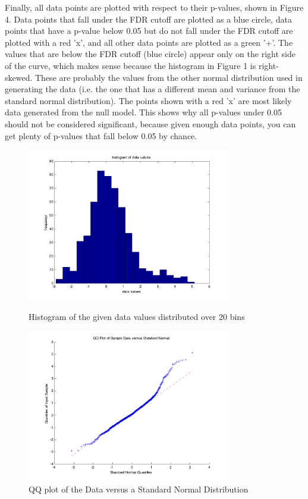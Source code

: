 \documentclass{acm_proc_article-sp}
\begin{document}
Finally, all data points are plotted with respect to their p-values, shown in Figure 4.  Data points that fall under the FDR cutoff are plotted as a blue circle, data points that have a p-value below 0.05 but do not fall under the FDR cutoff are plotted with a red 'x', and all other data points are plotted as a green '+'.  The values that are below the FDR cutoff (blue circle) appear only on the right side of the curve, which makes sense because the histogram in Figure 1 is right-skewed.  These are probably the values from the other normal distribution used in generating the data (i.e. the one that has a different mean and variance from the standard normal distribution).  The points shown with a red 'x' are most likely data generated from the null model.  This shows why all p-values under 0.05 should not be considered significant, because given enough data points, you can get plenty of p-values that fall below 0.05 by chance.  

\begin{figure}[t]
\centering
   \includegraphics[width=3.5in]{hist.png}
\caption{Histogram of the given data values distributed over 20 bins}

\includegraphics[width=3.5in]{qq.png}
\caption{QQ plot of the Data versus a Standard Normal Distribution}
\end{figure}
\end{document}

